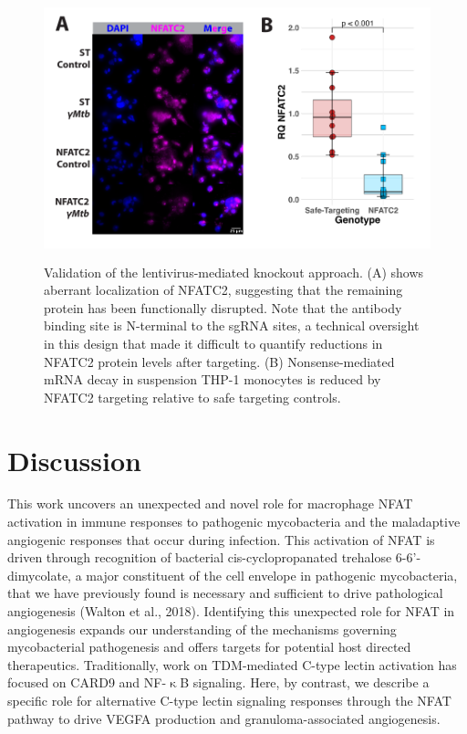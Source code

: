 \begin{figure}
\centering
\includegraphics[height=3in]{images/lentivalid.pdf}
\caption{Validation of the lentivirus-mediated knockout approach. (A) shows aberrant localization of NFATC2, suggesting that the remaining protein has been functionally disrupted. Note that the antibody binding site is N-terminal to the sgRNA sites, a technical oversight in this design that made it difficult to quantify reductions in NFATC2 protein levels after targeting. (B) Nonsense-mediated mRNA decay in suspension THP-1 monocytes is reduced by NFATC2 targeting relative to safe targeting controls.}
\label{figure:validation}
\end{figure}

\section{Discussion}\label{pap:disc}

This work uncovers an unexpected and novel role for macrophage NFAT activation in immune responses to pathogenic mycobacteria and the maladaptive angiogenic responses that occur during infection. This activation of NFAT is driven through recognition of bacterial cis\hyp{}cyclopropanated trehalose 6\hyp{}6'\hyp{}dimycolate, a major constituent of the cell envelope in pathogenic mycobacteria, that we have previously found is necessary and sufficient to drive pathological angiogenesis (Walton et al., 2018). Identifying this unexpected role for NFAT in angiogenesis expands our understanding of the mechanisms governing mycobacterial pathogenesis and offers targets for potential host directed therapeutics. Traditionally, work on TDM-mediated C-type lectin activation has focused on CARD9 and NF-$\upkappa$B signaling. Here, by contrast, we describe a specific role for alternative C-type lectin signaling responses through the NFAT pathway to drive VEGFA production and granuloma-associated angiogenesis. 

